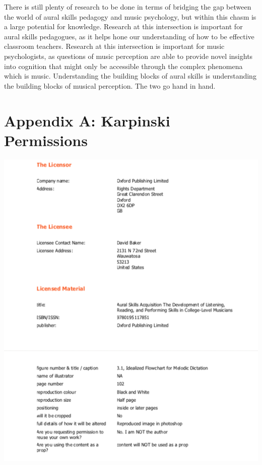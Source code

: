 \documentclass[12pt,]{book}
\begin{document}
There is still plenty of research to be done in terms of bridging the gap between the world of aural skills pedagogy and music psychology, but within this chasm is a large potential for knowledge.
Research at this intersection is important for aural skills pedagogues, as it helps hone our understanding of how to be effective classroom teachers.
Research at this intersection is important for music psychologists, as questions of music perception are able to provide novel insights into cognition that might only be accessible through the complex phenomena which is music.
Understanding the building blocks of aural skills is understanding the building blocks of musical perception.
The two go hand in hand.

\clearpage

\clearpage



\backmatter
\chapter{Appendix A: Karpinski Permissions}

\thispagestyle{empty}
\begin{center}
\includegraphics{img/karpinskipermission.png}
\end{center}
\end{document}
